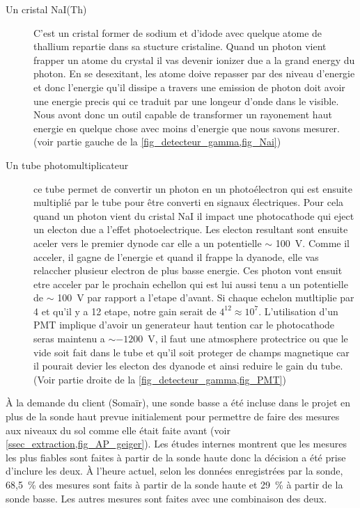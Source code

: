 \begin{description}
    \item[Un cristal NaI(Th)] C'est un cristal former de sodium et d'idode avec quelque atome de thallium repartie dans sa stucture cristaline. Quand un photon vient frapper un atome du crystal il vas devenir ionizer due a la grand energy du photon. En se desexitant, les atome doive repasser par des niveau d'energie et donc l'energie qu'il dissipe a travers une emission de photon doit avoir une energie precis qui ce traduit par une longeur d'onde dans le visible. Nous avont donc un outil capable de transformer un rayonement haut energie en quelque chose avec moins d'energie que nous savons mesurer. (voir partie gauche de la \cref{fig_detecteur_gamma,fig_Nai})~\cite{site:explication_NaI}
    \item[Un tube photomultiplicateur]ce tube permet de convertir un photon en un photoélectron qui est ensuite multiplié par le tube pour être converti en signaux électriques. Pour cela quand un photon vient du cristal NaI il impact une photocathode qui eject un electon due a l'effet photoelectrique. Les electon resultant sont ensuite aceler vers le premier dynode car elle a un potentielle $\sim$ 100~V. Comme il acceler, il gagne de l'energie et quand il frappe la dyanode, elle vas relaccher plusieur electron de plus basse energie. Ces photon vont ensuit etre acceler par le prochain echellon qui est lui aussi tenu a un potentielle de $\sim$ 100~V par rapport a l'etape d'avant. Si chaque echelon mutltiplie par 4 et qu'il y a 12 etape, notre gain serait de $4^{12}\approx10^{7}$. L'utilisation d'un PMT implique d'avoir un generateur haut tention car le photocathode seras maintenu a $\sim-1200$~V, il faut une atmosphere protectrice ou que le vide soit fait dans le tube et qu'il soit proteger de champs magnetique car il pourait devier les electon des dyanode et ainsi reduire le gain du tube. (Voir partie droite de la \cref{fig_detecteur_gamma,fig_PMT})~\cite{book:photomultiplier_tube}
\end{description}

À la demande du client (Somaïr), une sonde basse a été incluse dans le projet en plus de la sonde haut prevue initialement pour permettre de faire des mesures aux niveaux du sol comme elle était faite avant (voir \cref{ssec_extraction,fig_AP_geiger}). %
Les études internes montrent que les mesures les plus fiables sont faites à partir de la sonde haute donc la décision a été prise d'inclure les deux. À l'heure actuel, selon les données enregistrées par la sonde, 68,5~\% des mesures sont faits à partir de la sonde haute et 29~\% à partir de la sonde basse. Les autres mesures sont faites avec une combinaison des deux.

